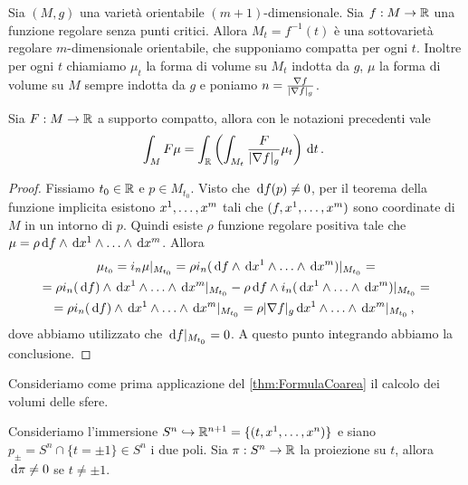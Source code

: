 Sia $(M,g)$ una varietà orientabile $(m+1)$-dimensionale. Sia $f:M \to \R$ una funzione regolare senza punti critici. Allora $M_t = f^{-1} (t)$ è una sottovarietà regolare $m$-dimensionale orientabile, che supponiamo compatta per ogni $t$.
Inoltre per ogni $t$ chiamiamo $\mu_t$ la forma di volume su $M_t$ indotta da $g$, $\mu$ la forma di volume su $M$ sempre indotta da $g$ e poniamo $n = \frac{\grad f}{\abs{\grad f}_g}$.

\begin{theorem}  \label{thm:FormulaCoarea} 
Sia $F:M \to \R$ a supporto compatto, allora con le notazioni precedenti vale
\begin{equation*}
	\int_M F \mu = \int_\R \left( \int_{M_t} \frac F{\abs{\grad f}_g} \mu_t \right) \de t \punto
\end{equation*}
\end{theorem}

\begin{proof} %
	Fissiamo $t_0\in\R$ e $p\in M_{t_0}$. Visto che $\de f(p) \not = 0$, per il teorema della funzione implicita esistono $\seqa xm,$ tali che $(f, \seqa xm,)$ sono coordinate di $M$ in un intorno di $p$.
	Quindi esiste $\rho$ funzione regolare positiva tale che $\mu = \rho \de f \wedge \seqa {\de x}m\wedge$. Allora
	\begin{multline*}
		\mu_{t_0} = i_n \mu \restrict{M_{t_0}} = \rho i_n (\de f \wedge \seqa {\de x}m\wedge)\restrict{M_{t_0}} =\\
		= \rho i_n(\de f) \wedge \seqa {\de x}m\wedge \restrict{M_{t_0}} - \rho \de f \wedge i_n (\seqa {\de x}m\wedge)\restrict{M_{t_0}} =\\
		=\rho i_n(\de f) \wedge \seqa {\de x}m\wedge \restrict{M_{t_0}} =\rho \abs{\grad f}_g \seqa {\de x}m\wedge \restrict{M_{t_0}} \virgola
	\end{multline*}
	dove abbiamo utilizzato che $\de f\restrict {M_{t_0}} = 0$.
	A questo punto integrando abbiamo la conclusione.
\end{proof}

Consideriamo come prima applicazione del \cref{thm:FormulaCoarea} il calcolo dei volumi delle sfere.

Consideriamo l'immersione $S^n \hookrightarrow \R^{n+1} = \{(t,\seqa xn,)\}$ e siano $p_\pm = S^n\cap\{t=\pm 1\} \in S^n$ i due poli. Sia $\pi:S^n \to \R$ la proiezione su $t$, allora $\de \pi \not=0$ se $t\not=\pm 1$.

